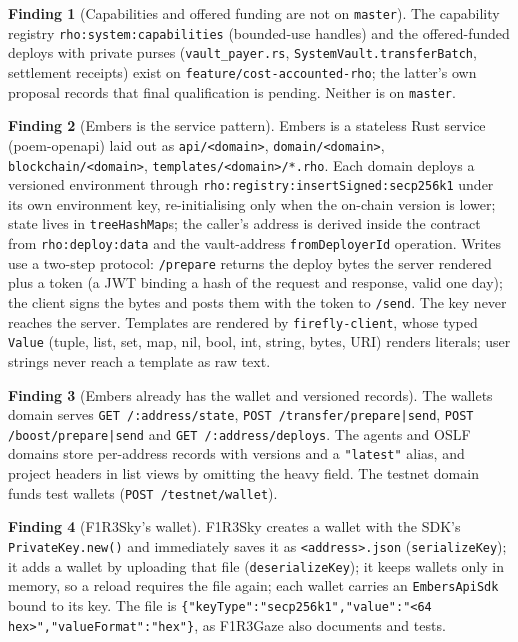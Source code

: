 \documentclass[11pt]{article}
\theoremstyle{definition}
\newtheorem{finding}{Finding}
\theoremstyle{remark}
\newcommand{\code}[1]{\texttt{#1}}
\newcommand{\Em}{Embers}
\newcommand{\Sky}{F1R3Sky}
\newcommand{\Gz}{F1R3Gaze}
\begin{document}
\begin{finding}[Capabilities and offered funding are not on \code{master}]\label{f:branch}
The capability registry \code{rho:system:capabilities} (bounded-use handles) and the
offered-funded deploys with private purses (\code{vault\_payer.rs},
\code{SystemVault.transferBatch}, settlement receipts) exist on
\code{feature/cost-accounted-rho}; the latter's own proposal records that final
qualification is pending. Neither is on \code{master}.
\end{finding}

\begin{finding}[\Em{} is the service pattern]\label{f:embers}
\Em{} is a stateless Rust service (poem-openapi) laid out as
\code{api/<domain>}, \code{domain/<domain>}, \code{blockchain/<domain>},
\code{templates/<domain>/*.rho}. Each domain deploys a versioned environment through
\code{rho:registry:insertSigned:secp256k1} under its own environment key,
re-initialising only when the on-chain version is lower; state lives in
\code{treeHashMap}s; the caller's address is derived inside the contract from
\code{rho:deploy:data} and the vault-address \code{fromDeployerId} operation. Writes
use a two-step protocol: \code{/prepare} returns the deploy bytes the server rendered
plus a token (a JWT binding a hash of the request and response, valid one day);
the client signs the bytes and posts them with the token to \code{/send}. The key
never reaches the server. Templates are rendered by \code{firefly-client}, whose
typed \code{Value} (tuple, list, set, map, nil, bool, int, string, bytes, URI)
renders literals; user strings never reach a template as raw text.
\end{finding}

\begin{finding}[\Em{} already has the wallet and versioned records]\label{f:emberswallet}
The wallets domain serves \code{GET /:address/state}, \code{POST
/transfer/prepare|send}, \code{POST /boost/prepare|send} and \code{GET
/:address/deploys}. The agents and OSLF domains store per-address records with
versions and a \code{"latest"} alias, and project headers in list views by omitting
the heavy field. The testnet domain funds test wallets (\code{POST /testnet/wallet}).
\end{finding}

\begin{finding}[\Sky{}'s wallet]\label{f:sky}
\Sky{} creates a wallet with the SDK's \code{PrivateKey.new()} and immediately saves
it as \code{<address>.json} (\code{serializeKey}); it adds a wallet by uploading that
file (\code{deserializeKey}); it keeps wallets only in memory, so a reload requires
the file again; each wallet carries an \code{EmbersApiSdk} bound to its key. The file
is \code{\{"keyType":"secp256k1","value":"<64 hex>","valueFormat":"hex"\}}, as \Gz{}
also documents and tests.
\end{finding}
\end{document}
